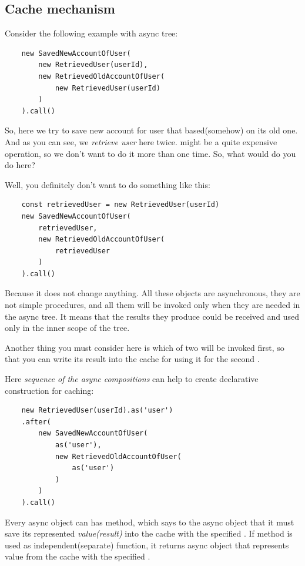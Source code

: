 \documentclass{article}
\begin{document}
\subsection{Cache mechanism}

Consider the following example with async tree:
\newline

\begin{verbatim}
    new SavedNewAccountOfUser(
        new RetrievedUser(userId),
        new RetrievedOldAccountOfUser(
            new RetrievedUser(userId)
        )
    ).call()
\end{verbatim}

So, here we try to save new account for user that based(somehow) on its old one. And as you can see, we \textit{retrieve user} here twice.  might be a quite expensive operation, so we don't want to do it more than one time. So, what would do you do here?

Well, you definitely don't want to do something like this:

\begin{verbatim}
    const retrievedUser = new RetrievedUser(userId)
    new SavedNewAccountOfUser(
        retrievedUser,
        new RetrievedOldAccountOfUser(
            retrievedUser
        )
    ).call()
\end{verbatim}

Because it does not change anything. All these objects are asynchronous, they are not simple procedures, and all them will be invoked only when they are needed in the async tree. It means that the results they produce could be received and used only in the inner scope of the tree.

Another thing you must consider here is which of two  will be invoked first, so that you can write its result into the cache for using it for the second .

Here \textit{sequence of the async compositions} can help to create declarative construction for caching:

\begin{verbatim}
    new RetrievedUser(userId).as('user')
    .after(
        new SavedNewAccountOfUser(
            as('user'),
            new RetrievedOldAccountOfUser(
                as('user')
            )
        )
    ).call()
\end{verbatim}

Every async object can has  method, which says to the async object that it must save its represented \textit{value(result)} into the cache with the specified . If  method is used as independent(separate) function, it returns async object that represents value from the cache with the specified .
\end{document}
